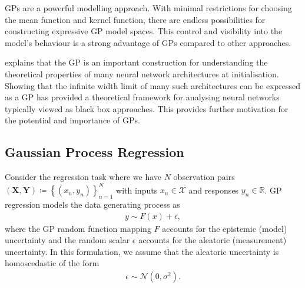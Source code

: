\documentclass{article}
\numberwithin{equation}{section}
\begin{document}
GPs are a powerful modelling approach. With minimal restrictions for choosing the mean function and kernel function, there are endless possibilities for constructing expressive GP model spaces.
This control and visibility into the model's behaviour is a strong advantage of GPs compared to other approaches.

\cite{novak2019neural} explains that the GP is an important construction for understanding the theoretical properties of many neural network architectures at initialisation.
Showing that the infinite width limit of many such architectures can be expressed as a GP has provided a theoretical framework for analysing neural networks typically viewed as black box approaches.
This provides further motivation for the potential and importance of GPs.

\subsection{Gaussian Process Regression}
Consider the regression task where we have $N$ observation pairs $(\mathbf{X}, \mathbf{Y}) \coloneqq \left\{(x_n, y_n)\right\}_{n=1}^{N}$ with inputs $x_n \in \mathcal{X}$ and responses $y_n \in \mathbb{R}$. GP regression models the data generating process as
\begin{align}
    y \sim F(x) + \epsilon,
    \label{regression-data-uncertainties}
\end{align}
where the GP random function mapping $F$ accounts for the epistemic (model) uncertainty and the random scalar $\epsilon$ accounts for the aleatoric (measurement) uncertainty. In this formulation, we assume that the aleatoric uncertainty is homoscedastic of the form
\begin{align}
    \epsilon \sim \mathcal{N} \left(0, \sigma^2\right).
    \label{aleotric-uncertainty}
\end{align}
\end{document}
